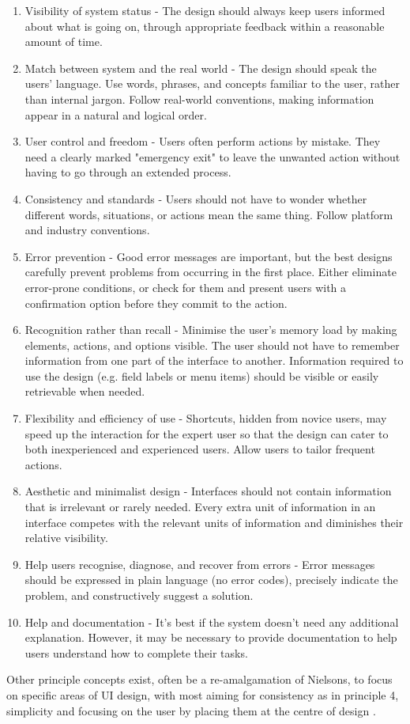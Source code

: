 \begin{enumerate}
    \item Visibility of system status - The design should always keep users informed about what is going on, through appropriate feedback within a reasonable amount of time.
    \item Match between system and the real world - The design should speak the users' language. Use words, phrases, and concepts familiar to the user, rather than internal jargon. Follow real-world conventions, making information appear in a natural and logical order.
    \item User control and freedom - Users often perform actions by mistake. They need a clearly marked "emergency exit" to leave the unwanted action without having to go through an extended process.
    \item Consistency and standards - Users should not have to wonder whether different words, situations, or actions mean the same thing. Follow platform and industry conventions.
    \item Error prevention - Good error messages are important, but the best designs carefully prevent problems from occurring in the first place. Either eliminate error-prone conditions, or check for them and present users with a confirmation option before they commit to the action.
    \item Recognition rather than recall - Minimise the user's memory load by making elements, actions, and options visible. The user should not have to remember information from one part of the interface to another. Information required to use the design (e.g. field labels or menu items) should be visible or easily retrievable when needed.
    \item Flexibility and efficiency of use - Shortcuts, hidden from novice users, may speed up the interaction for the expert user so that the design can cater to both inexperienced and experienced users. Allow users to tailor frequent actions.
    \item Aesthetic and minimalist design - Interfaces should not contain information that is irrelevant or rarely needed. Every extra unit of information in an interface competes with the relevant units of information and diminishes their relative visibility.
    \item Help users recognise, diagnose, and recover from errors - Error messages should be expressed in plain language (no error codes), precisely indicate the problem, and constructively suggest a solution.
    \item Help and documentation - It's best if the system doesn't need any additional explanation. However, it may be necessary to provide documentation to help users understand how to complete their tasks.
\end{enumerate}

Other principle concepts exist, often be a re-amalgamation of Nielsons, to focus on specific areas of \ac{UI} design, with most aiming for consistency as in principle 4, simplicity and focusing on the user by placing them at the centre of design \cite{uxpin_2020_the}.
